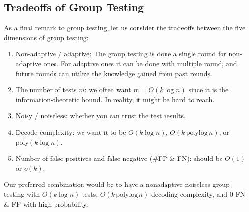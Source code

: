 \subsection{Tradeoffs of Group Testing}

As a final remark to group testing, let us consider the tradeoffs between the five dimensions of group testing:
\begin{enumerate}
    \item Non-adaptive / adaptive: The group testing is done a single round for non-adaptive ones. For adaptive ones it can be done with multiple round, and future rounds can utilize the knowledge gained from past rounds.
    \item The number of tests $m$: we often want $m=O(k\log n)$ since it is the information-theoretic bound. In reality, it might be hard to reach.
    \item Noisy / noiseless: whether you can trust the test results.
    \item Decode complexity: we want it to be $O(k\log n)$, $O(k\,\mathrm{polylog}\,n)$, or $\mathrm{poly}(k\log n)$.
    \item Number of false positives and false negative (\#FP \& FN): should be $O(1)$ or $o(k)$.
\end{enumerate}
Our preferred combination would be to have a nonadaptive noiseless group testing with $O(k\log n)$ tests, $O(k\,\mathrm{polylog}\,n)$ decoding complexity, and 0 FN \& FP with high probability.


